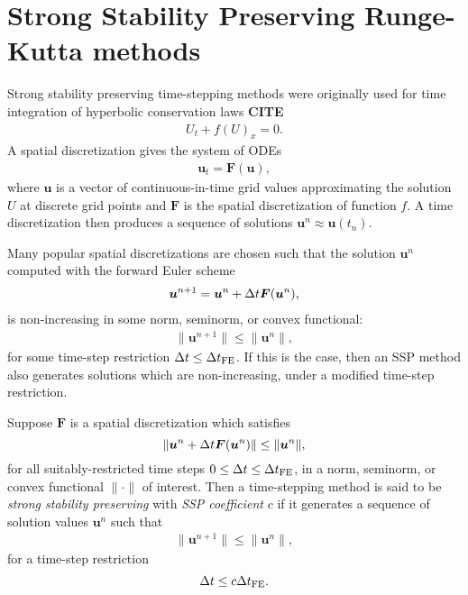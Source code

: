 \section{Strong Stability Preserving Runge-Kutta methods}
\label{sec:SSP}


Strong stability preserving time-stepping methods were originally used for time integration of hyperbolic conservation laws \textbf{CITE}
\begin{align*}
    U_t + f(U)_x = 0.   %
\end{align*}
A spatial discretization gives the system of ODEs
\begin{align*}
    \bm{u}_{t} = \bm{F}(\bm{u}),
\end{align*}
where $\bm{u}$ is a vector of continuous-in-time grid values approximating the solution $U$ at discrete grid points and $\bm{F}$ is the spatial discretization of function $f$.
A time discretization then produces a sequence of solutions $\bm{u}^{n} \approx \bm{u}(t_n)$.

Many popular spatial discretizations are chosen such that the solution $\bm{u}^{n}$ computed with the forward Euler scheme
\begin{align*}
    \bm{u}^{n+1} = \bm{u}^{n} + \Delta t\bm{F}(\bm{u}^{n}),
\end{align*}
is non-increasing in some norm, seminorm, or convex functional:
\begin{align*}
    \|\bm{u}^{n+1}\| \le \|\bm{u}^n\|,
\end{align*}
for some time-step restriction $\Delta t \leq \Delta t_{\text{FE}}$.
If this is the case, then an SSP method also generates solutions which are non-increasing, under a modified time-step restriction.
\begin{definition}
Suppose $\bm{F}$ is a spatial discretization which satisfies
$$\|\bm{u}^{n} + \Delta t\bm{F}(\bm{u}^{n})\| \le \|\bm{u}^n\|,$$
for all suitably-restricted time steps
$0 \le \Delta t \le \Delta t_{\text{FE}}$,
in a norm, seminorm, or convex functional $\|\cdot\|$ of interest.
Then a time-stepping method is said to be \emph{strong stability preserving} with \emph{SSP coefficient} $c$ if it generates a sequence of solution values $\bm{u}^n$ 
such that
\begin{align*}
  \|\bm{u}^{n+1}\| \le \|\bm{u}^n\|,
\end{align*}
for a time-step restriction
$$\Delta t \leq c \Delta t_{\text{FE}}.$$
\end{definition}


